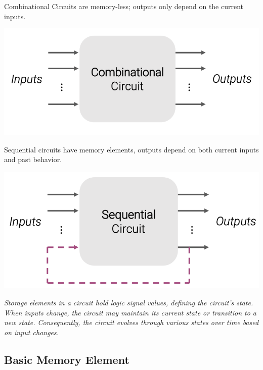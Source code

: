 \documentclass[12pt,openany]{book}
\begin{document}
\vspace*{10px}
\begin{minipage}{0.45\textwidth}
    Combinational Circuits are memory-less; outputs only depend on the current inputs.
    \begin{center}
        \includegraphics[width=\linewidth]{circuits/12.1.2.png}
    \end{center}
\end{minipage}
\hfill
\vline
\hfill
\begin{minipage}{0.45\textwidth}
	Sequential circuits have memory elements, outputs depend on both current inputs and past behavior.  
	\begin{center}
		\includegraphics[width=\linewidth]{circuits/12.1.2_2.png}
	\end{center}
\end{minipage}

\vspace*{10px}

\begin{justify}
	\textit{Storage elements in a circuit hold logic signal values, defining the circuit's state. When inputs change, the circuit may maintain its current state or transition to a new state. Consequently, the circuit evolves through various states over time based on input changes.}	
\end{justify}

\subsection{Basic Memory Element}
\end{document}
